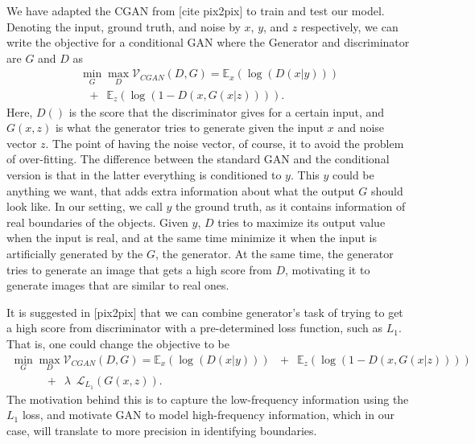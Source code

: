 We have adapted the CGAN from [cite pix2pix] to train and test our model. Denoting the input, ground truth, and noise by $x$, $y$, and $z$ respectively, we can write the objective for a conditional GAN where the Generator and discriminator are $G$ and $D$ as
\begin{equation}
\begin{array}{l}
\min_G \max_D \mathcal{V}_{CGAN}(D,G) = \mathbb{E}_{x}(\log(D(x|y)))\\
\, \, \, \,+ \, \, \, \mathbb{E}_{z}(\log(1-D(x,G(x|z)))).
\end{array}
\end{equation}
Here, $D()$ is the score that the discriminator gives for a certain input, and $G(x,z)$ is what the generator tries to generate given the input $x$ and noise vector $z$. The point of having the noise vector, of course, it to avoid the problem of over-fitting. The difference between the standard GAN and the conditional version is that in the latter everything is conditioned to $y$. This $y$ could be anything we want, that adds extra information about what the output $G$ should look like. In our setting, we call $y$ the ground truth, as it contains information of real boundaries of the objects. Given $y$, $D$ tries to maximize its output value when the input is real, and at the same time minimize it when the input is artificially generated by the $G$, the generator. At the same time, the generator tries to generate an image that gets a high score from $D$, motivating it to generate images that are similar to real ones.

It is suggested in [pix2pix] that we can combine generator's task of trying to get a high score from discriminator with a pre-determined loss function, such as $L_1$. That is, one could change the objective to be
\[
\begin{array}{l}
\min_G \max_D \mathcal{V}_{CGAN}(D,G) =
\mathbb{E}_{x}(\log(D(x|y))) \, \, \, \,+ \, \, \, \mathbb{E}_{z}(\log(1-D(x,G(x|z))))\\
 \quad \, \, \, \, \, \, \, \, \, \, \, \, + \, \, \, \lambda \, \, \, \mathcal{L}_{L_1}(G(x,z)).
\end{array}
\]
The motivation behind this is to capture the low-frequency information using the $L_1$ loss, and motivate GAN to model high-frequency information, which in our case, will translate to more precision in identifying boundaries.

